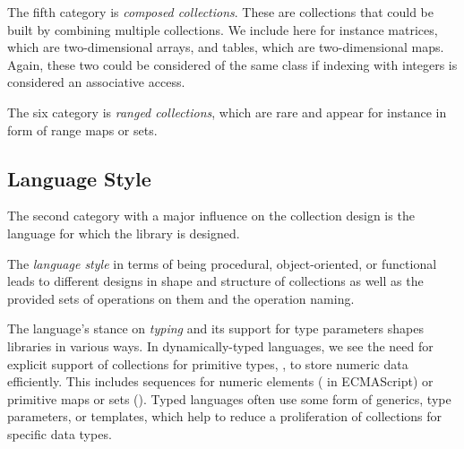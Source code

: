 \documentclass[sigconf, 10pt]{acmart}
\begin{document}
The fifth category is \emph{composed collections}.
These are collections that could be built by combining multiple collections.
We include here for instance matrices, which are two-dimensional arrays,
and tables, which are two-dimensional maps.
Again, these two could be considered of the same class
if indexing with integers is considered an associative access.

The six category is \emph{ranged collections},
which are rare and appear for instance in form of range maps or sets.

\subsection{Language Style}
\label{sec:language-style}

The second category with a major influence on the collection design
is the language for which the library is designed.

The \emph{language style} in terms of being procedural, object-oriented,
or functional leads to different designs in shape and structure of collections
as well as the provided sets of operations on them and the operation naming.

The language's stance on \emph{typing} and its support for type parameters
shapes libraries in various ways.
In dynamically-typed languages,
we see the need for explicit support of collections for primitive types, \eg,
to store numeric data efficiently.
This includes sequences for numeric elements (\eg {} in ECMAScript)
or primitive maps or sets (\eg {}).
Typed languages often use some form of generics, type parameters, or templates,
which help to reduce a proliferation of collections for specific data types.
\end{document}
